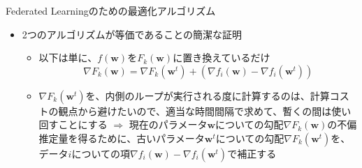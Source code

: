 \documentclass[dvipdfmx,notheorems,t]{beamer}
\begin{document}
\begin{frame}{Federated Learningのための最適化アルゴリズム}

\begin{itemize}
	\item 2つのアルゴリズムが等価であることの簡潔な証明
	\begin{itemize}
		\item 以下は単に、$f(\bm{w})$を$F_k(\bm{w})$に置き換えているだけ
		\begin{equation}
			\nabla F_k(\bm{w}) = \nabla F_k(\bm{w}^t) + \left( \nabla f_i(\bm{w}) - \nabla f_i(\bm{w}^t) \right)
		\end{equation}
		
		\item $\nabla F_k(\bm{w}^t)$を、内側のループが実行される度に計算するのは、計算コストの観点から避けたいので、適当な時間間隔で求めて、暫くの間は使い回すことにする \newline \newline
		$\Rightarrow$ 現在のパラメータ$\bm{w}$についての勾配$\nabla F_k(\bm{w})$の不偏推定量を得るために、古いパラメータ$\bm{w}^t$についての勾配$\nabla F_k(\bm{w}^t)$を、\color{red}データ$i$についての項$\nabla f_i(\bm{w}) - \nabla f_i(\bm{w}^t)$で補正\normalcolor する
	\end{itemize}
\end{itemize}

\end{frame}
\end{document}

